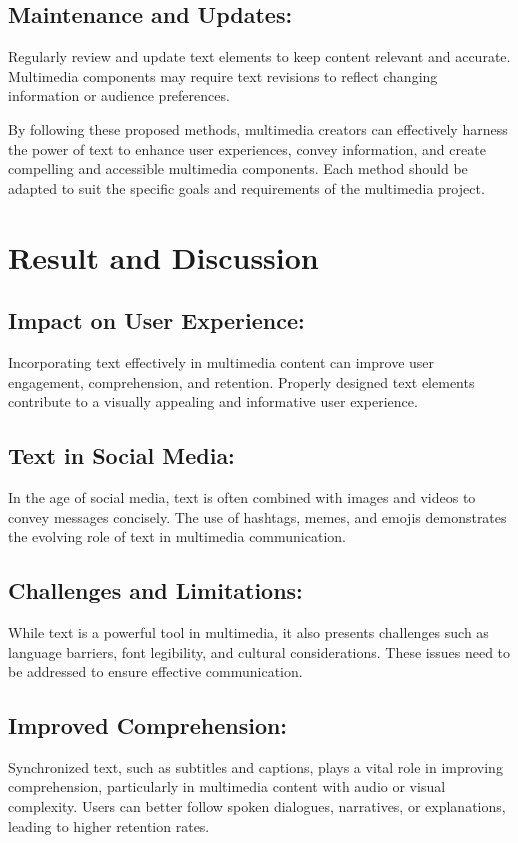 \documentclass[12pt]{report}
\begin{document}
\subsection*{Maintenance and Updates:} Regularly review and update text elements to keep content relevant and accurate. Multimedia components may require text revisions to reflect changing information or audience preferences.

By following these proposed methods, multimedia creators can effectively harness the power of text to enhance user experiences, convey information, and create compelling and accessible multimedia components. Each method should be adapted to suit the specific goals and requirements of the multimedia project.\cite{multimedia}

\newpage
\section*{Result and Discussion}
\subsection*{Impact on User Experience:} Incorporating text effectively in multimedia content can improve user engagement, comprehension, and retention. Properly designed text elements contribute to a visually appealing and informative user experience.\cite{user}
\subsection*{Text in Social Media:} In\cite{social}  the age of social media, text is often combined with images and videos to convey messages concisely. The use of hashtags, memes, and emojis demonstrates the evolving role of text in multimedia communication.
\subsection*{Challenges and Limitations:} While text is a powerful tool in multimedia, it also presents challenges such as language barriers, font legibility, and cultural considerations. These issues need to be addressed to ensure effective communication.
\subsection*{Improved Comprehension:} Synchronized text, such as subtitles and captions, plays a vital role in improving comprehension, particularly in multimedia content with audio or visual complexity. Users can better follow spoken dialogues, narratives, or explanations, leading to higher retention rates.
\end{document}
